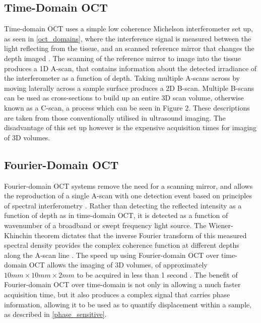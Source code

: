 \subsection{Time-Domain OCT}
Time-domain OCT uses a simple low coherence Michelson interferometer set up, as seen in \autoref{oct_domains}, where the interference signal is measured between the light reflecting from the tissue, and an scanned reference mirror that changes the depth imaged \cite{huang_optical_1991}. The scanning of the reference mirror to image into the tissue produces a 1D A-scan, that contains information about the detected irradiance of the interferometer as a function of depth. Taking multiple A-scans across by moving laterally across a sample surface produces a 2D B-scan. Multiple B-scans can be used as cross-sections to build up an entire 3D scan volume, otherwise known as a C-scan, a process which can be seen in Figure 2. These descriptions are taken from those conventionally utilised in ultrasound imaging. The disadvantage of this set up however is the expensive acquisition times for imaging of 3D volumes.

\subsection{Fourier-Domain OCT}
Fourier-domain OCT systems remove the need for a scanning mirror, and allows the reproduction of a single A-scan with one detection event based on principles of spectral interferometry \cite{chin_parametric_2016}. Rather than detecting the reflected intensity as a function of depth as in time-domain OCT, it is detected as a function of wavenumber of a broadband or swept frequency light source. The Wiener-Khinchin theorem dictates that the inverse Fourier transform of this measured spectral density provides the complex coherence function at different depths along the A-scan line \cite{schmitt_optical_1999}. The speed up using Fourier-domain OCT over time-domain OCT allows the imaging of 3D volumes, of approximately $10mm \times 10mm \times 2mm$ to be acquired in less than 1 second \cite{kennedy_emergence_2017}. The benefit of Fourier-domain OCT over time-domain is not only in allowing a much faster acquisition time, but it also produces a complex signal that carries phase information, allowing it to be used as to quantify displacement within a sample, as described in \autoref{phase_sensitive}.

